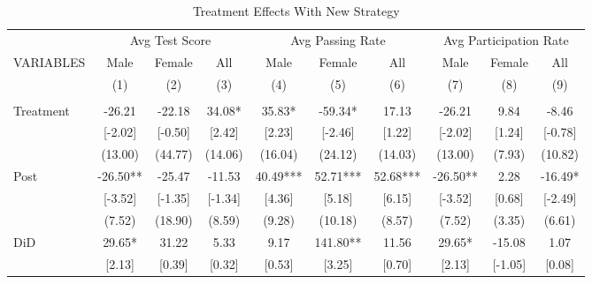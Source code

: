 \documentclass[12pt,letterpaper]{article}
\theoremstyle{plain}
\newenvironment{tptable}[1][h]{
    \begin{table}[#1]
        \centering
        \begin{threeparttable}[b]
}{
        \end{threeparttable}
    \end{table}
}
\newenvironment{ltptable}[1][h]{
    \begin{landscape}
    \begin{tptable}[#1]
}{
    \end{tptable}
    \end{landscape}
}
\begin{document}
\begin{ltptable}[h]
\setlength{\tabcolsep}{0pt}
    \small
    \caption{Treatment Effects With New Strategy}
    \begin{tabular*}{\linewidth}{@{\extracolsep{\fill}}lccccccccc@{}}
    \toprule
        \multicolumn{1}{l}{} &
        \multicolumn{3}{c}{Avg Test Score} &
        \multicolumn{3}{c}{Avg Passing Rate} &
        \multicolumn{3}{c}{Avg Participation Rate} \\
        \cmidrule{2-4}
        \cmidrule{5-7}
        \cmidrule{8-10}
VARIABLES   & Male       & Female   & All       & Male          & Female    & All       & Male      & Female& All \\
            &     (1)    & (2)      & (3)       & (4)           & (5)       & (6)       & (7)       & (8)   & (9) \\
\midrule
            &               &               &                   &           &           &           &       &   & \\
Treatment   &      -26.21   &      -22.18   &       34.08*  &       35.83*  &      -59.34*  &       17.13   &      -26.21   &        9.84   &       -8.46   \\
            &     [-2.02]   &     [-0.50]   &      [2.42]   &      [2.23]   &     [-2.46]   &      [1.22]   &     [-2.02]   &      [1.24]   &     [-0.78]   \\
            &     (13.00)   &     (44.77)   &     (14.06)   &     (16.04)   &     (24.12)   &     (14.03)   &     (13.00)   &      (7.93)   &     (10.82)   \\
Post        &      -26.50** &      -25.47   &      -11.53   &       40.49***&       52.71***&       52.68***&      -26.50** &        2.28   &      -16.49*  \\
            &     [-3.52]   &     [-1.35]   &     [-1.34]   &      [4.36]   &      [5.18]   &      [6.15]   &     [-3.52]   &      [0.68]   &     [-2.49]   \\
            &      (7.52)   &     (18.90)   &      (8.59)   &      (9.28)   &     (10.18)   &      (8.57)   &      (7.52)   &      (3.35)   &      (6.61)   \\
DiD         &       29.65*  &       31.22   &        5.33   &        9.17   &      141.80** &       11.56   &       29.65*  &      -15.08   &        1.07   \\
            &      [2.13]   &      [0.39]   &      [0.32]   &      [0.53]   &      [3.25]   &      [0.70]   &      [2.13]   &     [-1.05]   &      [0.08]   \\

\end{tabular*}
\end{ltptable}
\end{document}
